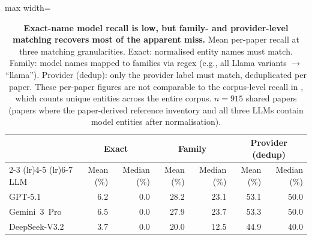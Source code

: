 \begin{table}[H]
\centering
\caption{\textbf{Exact-name model recall is low, but family- and provider-level matching recovers most of the apparent miss.} Mean per-paper recall at three matching granularities. Exact: normalised entity names must match. Family: model names mapped to families via regex (e.g., all Llama variants $\to$ ``llama''). Provider (dedup): only the provider label must match, deduplicated per paper. These per-paper figures are not comparable to the corpus-level recall in , which counts unique entities across the entire corpus. $n = 915$ shared papers (papers where the paper-derived reference inventory and all three LLMs contain model entities after normalisation).}
\label{tab:family_matching}
\begin{adjustbox}{max width=\textwidth}
\begin{tabular}{l rr rr rr}
\toprule
& \multicolumn{2}{c}{Exact} & \multicolumn{2}{c}{Family} & \multicolumn{2}{c}{Provider (dedup)} \\
\cmidrule(lr){2-3} \cmidrule(lr){4-5} \cmidrule(lr){6-7}
LLM & Mean (\%) & Median (\%) & Mean (\%) & Median (\%) & Mean (\%) & Median (\%) \\
\midrule
GPT-5.1 & 6.2 & 0.0 & 28.2 & 23.1 & 53.1 & 50.0 \\
Gemini~3~Pro & 6.5 & 0.0 & 27.9 & 23.7 & 53.3 & 50.0 \\
DeepSeek-V3.2 & 3.7 & 0.0 & 20.0 & 12.5 & 44.9 & 40.0 \\
\bottomrule
\end{tabular}
\end{adjustbox}
\end{table}